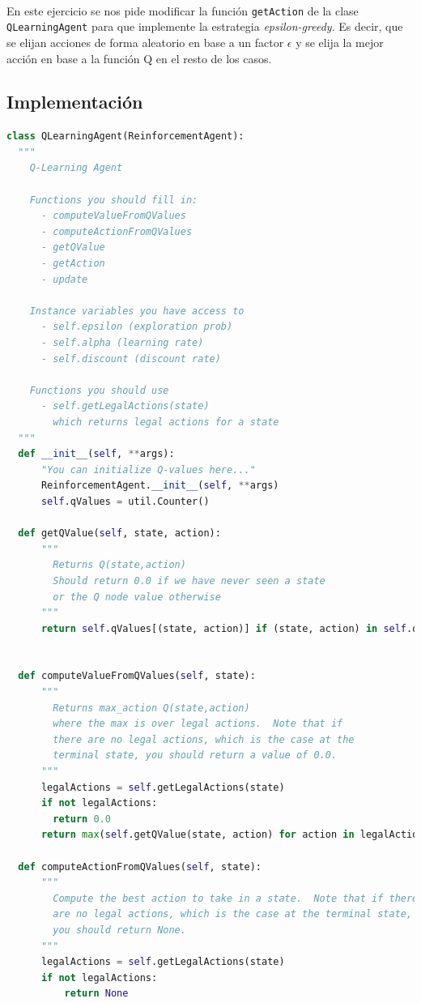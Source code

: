\documentclass{report}
\begin{document}
        \paragraph*{}{
          En este ejercicio se nos pide modificar la función \texttt{getAction} de la clase \texttt{QLearningAgent} para que implemente la estrategia \textit{epsilon-greedy}.
          Es decir, que se elijan acciones de forma aleatorio en base a un factor \(\epsilon\) y se elija la mejor acción en base a la función Q en el resto de los casos.
        }
      \subsection*{Implementación}
\begin{lstlisting}[language=Python, caption=Epsilon Greedy]
class QLearningAgent(ReinforcementAgent):
  """
    Q-Learning Agent

    Functions you should fill in:
      - computeValueFromQValues
      - computeActionFromQValues
      - getQValue
      - getAction
      - update

    Instance variables you have access to
      - self.epsilon (exploration prob)
      - self.alpha (learning rate)
      - self.discount (discount rate)

    Functions you should use
      - self.getLegalActions(state)
        which returns legal actions for a state
  """
  def __init__(self, **args):
      "You can initialize Q-values here..."
      ReinforcementAgent.__init__(self, **args)
      self.qValues = util.Counter()

  def getQValue(self, state, action):
      """
        Returns Q(state,action)
        Should return 0.0 if we have never seen a state
        or the Q node value otherwise
      """
      return self.qValues[(state, action)] if (state, action) in self.qValues else 0.0


  def computeValueFromQValues(self, state):
      """
        Returns max_action Q(state,action)
        where the max is over legal actions.  Note that if
        there are no legal actions, which is the case at the
        terminal state, you should return a value of 0.0.
      """
      legalActions = self.getLegalActions(state)
      if not legalActions:
        return 0.0
      return max(self.getQValue(state, action) for action in legalActions)
      
  def computeActionFromQValues(self, state):
      """
        Compute the best action to take in a state.  Note that if there
        are no legal actions, which is the case at the terminal state,
        you should return None.
      """
      legalActions = self.getLegalActions(state)
      if not legalActions:
          return None


\end{lstlisting}
\end{document}
